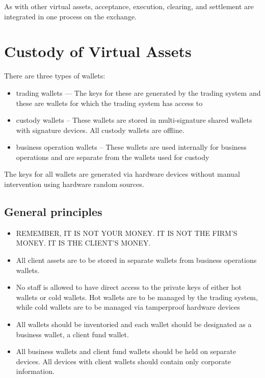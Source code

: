 As with other virtual assets, acceptance, execution, clearing, and
settlement are integrated in one process on the exchange.

\section{Custody of Virtual Assets}

There are three types of wallets:
\begin{itemize}
  \item trading wallets — The keys for these are generated by the
    trading system and these are wallets for which the trading system
    has access to
  \item custody wallets – These wallets are stored in multi-signature
    shared wallets with signature devices.  All custody wallets are offline.
  \item business operation wallets – These wallets are used internally
    for business operations and are separate from the wallets used for
    custody
\end{itemize}

The keys for all wallets are generated via hardware devices without
manual intervention using hardware random sources.


\subsection{General principles}
\begin{itemize}
\item REMEMBER, IT IS NOT YOUR MONEY.  IT IS NOT THE FIRM'S MONEY.  IT IS THE CLIENT'S MONEY.
\end{itemize}

\begin{itemize}
  \item All client assets are to be stored in separate wallets from
    business operations wallets.
  \item No staff is allowed to have direct access to the private keys
    of either hot
    wallets or cold wallets.  Hot wallets are to be managed by the
    trading system, while cold wallets are to be managed via
    tamperproof hardware devices 
  \item All wallets should be inventoried and each wallet should be designated
    as a business wallet, a client fund wallet.
  \item All business wallets and client fund wallets should be held on
separate devices.  All devices with client wallets should contain only
corporate information.
\end{itemize}

